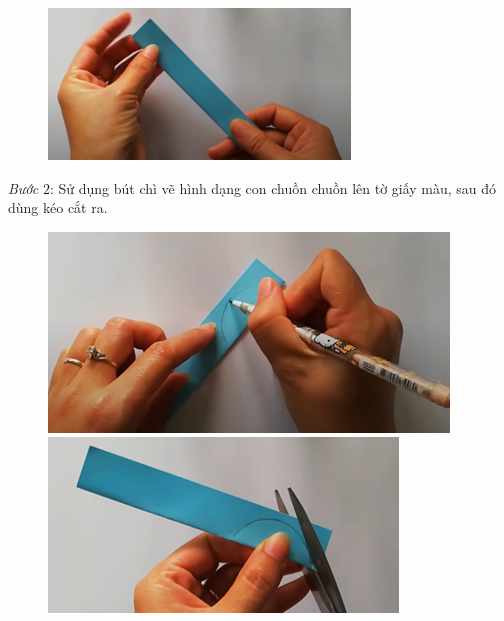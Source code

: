 \begin{multicols}{2}
\begin{figure}[H]
		\vspace*{1pt}
		\hspace*{1pt}\includegraphics[width=0.7\linewidth]{63}
		\vspace*{-10pt}
	\end{figure}
	\textit{Bước} $2$: Sử dụng bút chì vẽ hình dạng con chuồn chuồn lên tờ giấy màu, sau đó dùng kéo cắt ra.
	\begin{figure}[H]
		\vspace*{5pt}
		\centering
		\captionsetup{labelformat= empty, justification=centering}
		\includegraphics[width=0.7\linewidth]{64}
		
		\vspace*{1pt}
		\includegraphics[width=0.7\linewidth]{65}
		

\end{figure}
\end{multicols}
